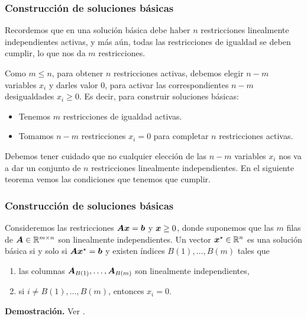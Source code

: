 \documentclass[aspectratio=169,12pt,spanish]{beamer}
\begin{document}

\begin{frame}
\frametitle{Construcción de soluciones básicas}


Recordemos que en una solución básica debe haber $n$ restricciones linealmente independientes activas, y más aún, todas las restricciones de igualdad se deben cumplir, lo que nos da $m$ restricciones.

Como $m \le n$, para obtener $n$ restricciones activas, debemos elegir $n - m$ variables $x_i$ y darles valor $0$, para activar las correspondientes $n-m$ desigualdades $x_i \ge 0$. Es decir, para construir soluciones básicas:
\begin{itemize}
\item Tenemos $m$ restricciones de igualdad activas.
\item Tomamos $n - m$ restricciones $x_i = 0$ para completar $n$ restricciones activas.
\end{itemize}

Debemos tener cuidado que no cualquier elección de las $n-m$ variables $x_i$ nos va a dar un conjunto de $n$ restricciones linealmente independientes. En el siguiente teorema vemos las condiciones que tenemos que cumplir.


\end{frame}


\begin{frame}
\frametitle{Construcción de soluciones básicas}

\begin{theorem}
Consideremos las restricciones $\bm{A}\bm{x} = \bm{b}$ y $\bm{x} \ge 0$, donde suponemos que las $m$ filas de $\bm{A} \in \mathbb{R}^{m \times n}$ son linealmente independientes.
Un vector $\bm{x}^\star \in \mathbb{R}^n$ es una solución básica si y solo si $\bm{A}\bm{x}^\star = \bm{b}$ y existen índices $B(1), \dots, B(m)$ tales que
\begin{enumerate}
\item las columnas $\bm{A}_{B(1)}, \dots, \bm{A}_{B(m)}$ son linealmente independientes,
\item si $i \neq B(1), \dots, B(m)$, entonces $x_i = 0$.
\end{enumerate}
\end{theorem}

\textbf{Demostración.} Ver \cite[Teorema 2.4]{Bertsimas1997}.

\end{frame}
\end{document}
